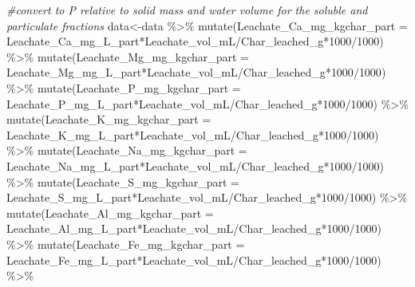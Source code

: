 \documentclass[
]{article}
\newenvironment{Shaded}{\begin{snugshade}}{\end{snugshade}}
\newcommand{\AttributeTok}[1]{\textcolor[rgb]{0.77,0.63,0.00}{#1}}
\newcommand{\CommentTok}[1]{\textcolor[rgb]{0.56,0.35,0.01}{\textit{#1}}}
\newcommand{\DecValTok}[1]{\textcolor[rgb]{0.00,0.00,0.81}{#1}}
\newcommand{\FunctionTok}[1]{\textcolor[rgb]{0.00,0.00,0.00}{#1}}
\newcommand{\NormalTok}[1]{#1}
\newcommand{\OtherTok}[1]{\textcolor[rgb]{0.56,0.35,0.01}{#1}}
\newcommand{\SpecialCharTok}[1]{\textcolor[rgb]{0.00,0.00,0.00}{#1}}
\begin{document}
\begin{Shaded}
\begin{Highlighting}[]
\CommentTok{\#convert to P relative to solid mass and water volume for the soluble and particulate fractions}
\NormalTok{data}\OtherTok{\textless{}{-}}\NormalTok{data }\SpecialCharTok{\%\textgreater{}\%}
  \FunctionTok{mutate}\NormalTok{(}\AttributeTok{Leachate\_Ca\_mg\_kgchar\_part =}\NormalTok{ Leachate\_Ca\_mg\_L\_part}\SpecialCharTok{*}\NormalTok{Leachate\_vol\_mL}\SpecialCharTok{/}\NormalTok{Char\_leached\_g}\SpecialCharTok{*}\DecValTok{1000}\SpecialCharTok{/}\DecValTok{1000}\NormalTok{) }\SpecialCharTok{\%\textgreater{}\%}
  \FunctionTok{mutate}\NormalTok{(}\AttributeTok{Leachate\_Mg\_mg\_kgchar\_part  =}\NormalTok{ Leachate\_Mg\_mg\_L\_part}\SpecialCharTok{*}\NormalTok{Leachate\_vol\_mL}\SpecialCharTok{/}\NormalTok{Char\_leached\_g}\SpecialCharTok{*}\DecValTok{1000}\SpecialCharTok{/}\DecValTok{1000}\NormalTok{) }\SpecialCharTok{\%\textgreater{}\%}
  \FunctionTok{mutate}\NormalTok{(}\AttributeTok{Leachate\_P\_mg\_kgchar\_part  =}\NormalTok{ Leachate\_P\_mg\_L\_part}\SpecialCharTok{*}\NormalTok{Leachate\_vol\_mL}\SpecialCharTok{/}\NormalTok{Char\_leached\_g}\SpecialCharTok{*}\DecValTok{1000}\SpecialCharTok{/}\DecValTok{1000}\NormalTok{) }\SpecialCharTok{\%\textgreater{}\%}
  \FunctionTok{mutate}\NormalTok{(}\AttributeTok{Leachate\_K\_mg\_kgchar\_part  =}\NormalTok{ Leachate\_K\_mg\_L\_part}\SpecialCharTok{*}\NormalTok{Leachate\_vol\_mL}\SpecialCharTok{/}\NormalTok{Char\_leached\_g}\SpecialCharTok{*}\DecValTok{1000}\SpecialCharTok{/}\DecValTok{1000}\NormalTok{) }\SpecialCharTok{\%\textgreater{}\%}
  \FunctionTok{mutate}\NormalTok{(}\AttributeTok{Leachate\_Na\_mg\_kgchar\_part  =}\NormalTok{ Leachate\_Na\_mg\_L\_part}\SpecialCharTok{*}\NormalTok{Leachate\_vol\_mL}\SpecialCharTok{/}\NormalTok{Char\_leached\_g}\SpecialCharTok{*}\DecValTok{1000}\SpecialCharTok{/}\DecValTok{1000}\NormalTok{) }\SpecialCharTok{\%\textgreater{}\%}
  \FunctionTok{mutate}\NormalTok{(}\AttributeTok{Leachate\_S\_mg\_kgchar\_part  =}\NormalTok{ Leachate\_S\_mg\_L\_part}\SpecialCharTok{*}\NormalTok{Leachate\_vol\_mL}\SpecialCharTok{/}\NormalTok{Char\_leached\_g}\SpecialCharTok{*}\DecValTok{1000}\SpecialCharTok{/}\DecValTok{1000}\NormalTok{) }\SpecialCharTok{\%\textgreater{}\%}
  \FunctionTok{mutate}\NormalTok{(}\AttributeTok{Leachate\_Al\_mg\_kgchar\_part  =}\NormalTok{ Leachate\_Al\_mg\_L\_part}\SpecialCharTok{*}\NormalTok{Leachate\_vol\_mL}\SpecialCharTok{/}\NormalTok{Char\_leached\_g}\SpecialCharTok{*}\DecValTok{1000}\SpecialCharTok{/}\DecValTok{1000}\NormalTok{) }\SpecialCharTok{\%\textgreater{}\%}
  \FunctionTok{mutate}\NormalTok{(}\AttributeTok{Leachate\_Fe\_mg\_kgchar\_part  =}\NormalTok{ Leachate\_Fe\_mg\_L\_part}\SpecialCharTok{*}\NormalTok{Leachate\_vol\_mL}\SpecialCharTok{/}\NormalTok{Char\_leached\_g}\SpecialCharTok{*}\DecValTok{1000}\SpecialCharTok{/}\DecValTok{1000}\NormalTok{) }\SpecialCharTok{\%\textgreater{}\%}

\end{Highlighting}
\end{Shaded}
\end{document}

